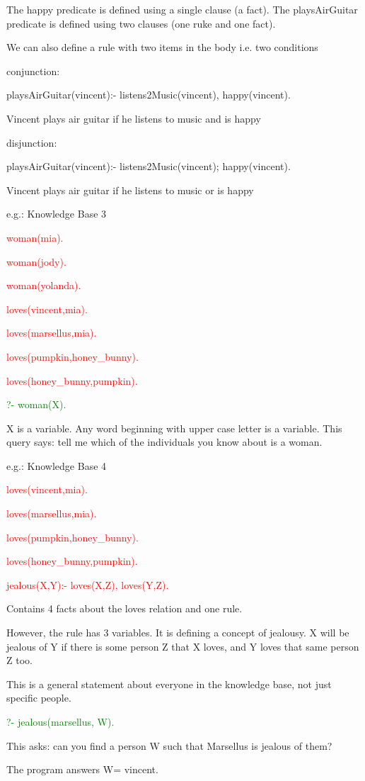 \documentclass{article}
\begin{document}
The happy predicate is defined using a single clause (a fact). The playsAirGuitar predicate is defined using two clauses (one ruke and one fact).

We can also define a rule with two items in the body i.e. two conditions

conjunction:

 playsAirGuitar(vincent):- listens2Music(vincent), happy(vincent). 

Vincent plays air guitar if he listens to music and is happy

disjunction:

 playsAirGuitar(vincent):- listens2Music(vincent); happy(vincent). 

Vincent plays air guitar if he listens to music or is happy


e.g.: Knowledge Base 3

\textcolor{red}{woman(mia).}

\textcolor{red}{woman(jody).}

\textcolor{red}{woman(yolanda).}

 \textcolor{red}{loves(vincent,mia).}

  \textcolor{red}{ loves(marsellus,mia).}

  \textcolor{red}{ loves(pumpkin,honey\_bunny).}

 \textcolor{red}{  loves(honey\_bunny,pumpkin). }

\textcolor{green}{?- woman(X).}

X is a variable. Any word beginning with upper case letter is a variable. This query says: tell me which of the individuals you know about is a woman.


e.g.: Knowledge Base 4

\textcolor{red}{ loves(vincent,mia).}

 \textcolor{red}{loves(marsellus,mia).}

  \textcolor{red}{ loves(pumpkin,honey\_bunny).}

 \textcolor{red}{  loves(honey\_bunny,pumpkin).}
   
 \textcolor{red}{  jealous(X,Y):-  loves(X,Z),  loves(Y,Z). }

Contains 4 facts about the loves relation and one rule.

However, the rule has 3 variables. It is defining a concept of jealousy. X will be jealous of Y if there is some person Z that X loves, and Y loves that same person Z too.

This is a general statement about everyone in the knowledge base, not just specific people.

\textcolor{green}{?- jealous(marsellus, W).}

This asks: can you find a person W such that Marsellus is jealous of them?

The program answers W= vincent.
\end{document}
